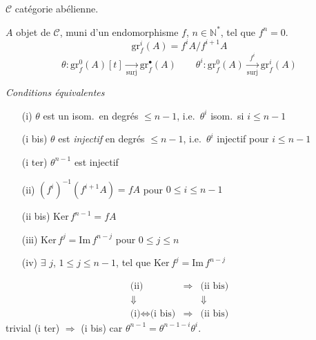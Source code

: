 \documentclass[11pt,a4paper]{article}
\begin{document}

$\mathcal{C}$ catégorie abélienne.

$A$ objet de $\mathcal{C}$, muni d'un endomorphisme $f$, $n \in \mathbb{N}^{*}$, tel que $f^n = 0$.
\[
\mathrm{gr}^i_f(A) = f^i A / f^{i+1} A
\]
\[
\theta : \mathrm{gr}^0_f(A)[t] \underset{\text{surj}}{\longrightarrow} \mathrm{gr}^{\bullet}_f(A)
\qquad
\theta^i : \mathrm{gr}^0_f(A) \underset{\text{surj}}{\xrightarrow{\;f^i\;}} \mathrm{gr}^i_f(A)
\]

\emph{Conditions équivalentes}
\begin{itemize}
  \item[(i)] $\theta$ est un isom.\ en degrés $\leq n-1$, i.e.\ $\theta^i$ isom.\ si $i \leq n-1$
  \item[(i bis)] $\theta$ est \emph{injectif} en degrés $\leq n-1$, i.e.\ $\theta^i$ injectif pour $i \leq n-1$
  \item[(i ter)] $\theta^{n-1}$ est injectif
  \item[(ii)] $(f^i)^{-1}(f^{i+1} A) = f A$ pour $0 \leq i \leq n-1$
  \item[(ii bis)]  \quad $\boxed{\mathrm{Ker}\, f^{n-1} = f A}$
  \item[(iii)] $\mathrm{Ker}\, f^j = \mathrm{Im}\, f^{n-j}$ pour  $0 \leq j \leq n$
  \item[(iv)] $\exists$ \struck{\ill{}} $j$, $1 \leq j \leq n-1$, tel que $\mathrm{Ker}\, f^j = \mathrm{Im}\, f^{n-j}$
\end{itemize}

\[
\begin{array}{ccc}
\text{(ii)} & \Longrightarrow & \text{(ii bis)} \\
\Downarrow & & \Downarrow \\
\text{(i)} \Longleftrightarrow \text{(i bis)} & \Longrightarrow & \text{(ii bis)}
\end{array}
\]
trivial \qquad (i ter) $\Longrightarrow$ (i bis) car $\theta^{n-1} = \theta^{n-1-i}\theta^{i}$.
\end{document}
